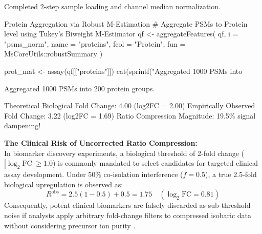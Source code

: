 \documentclass[11pt,oneside]{book}
\begin{document}
\begin{routput}
Completed 2-step sample loading and channel median normalization.
\end{routput}

\begin{rchunk}{Protein Aggregation via Robust M-Estimation}
# Aggregate PSMs to Protein level using Tukey's Biweight M-Estimator
qf <- aggregateFeatures(
  qf,
  i    = "psms_norm",
  name = "proteins",
  fcol = "Protein",
  fun  = MsCoreUtils::robustSummary
)

prot_mat <- assay(qf[["proteins"]])
cat(sprintf("Aggregated 1000 PSMs into %
\end{rchunk}

\begin{routput}
Aggregated 1000 PSMs into 200 protein groups.
\end{routput}


\begin{routput}
Theoretical Biological Fold Change: 4.00 (log2FC = 2.00)
Empirically Observed Fold Change:   3.22 (log2FC = 1.69)
Ratio Compression Magnitude:       19.5\% signal dampening!
\end{routput}

\begin{biologicalinsight}
\textbf{The Clinical Risk of Uncorrected Ratio Compression:}\\
In biomarker discovery experiments, a biological threshold of 2-fold change ($|\log_2| $) is commonly mandated to select candidates for targeted clinical assay development. Under 50\% co-isolation interference ($f = 0.5$), a true 2.5-fold biological upregulation is observed as:
$$R^{\text{obs}} = 2.5(1 - 0.5) + 0.5 = 1.75 \quad (\log_2\text{FC} = 0.81)$$
Consequently, potent clinical biomarkers are falsely discarded as sub-threshold noise if analysts apply arbitrary fold-change filters to compressed isobaric data without considering precursor ion purity \cite{ting2011sps}.
\end{biologicalinsight}
\end{document}
